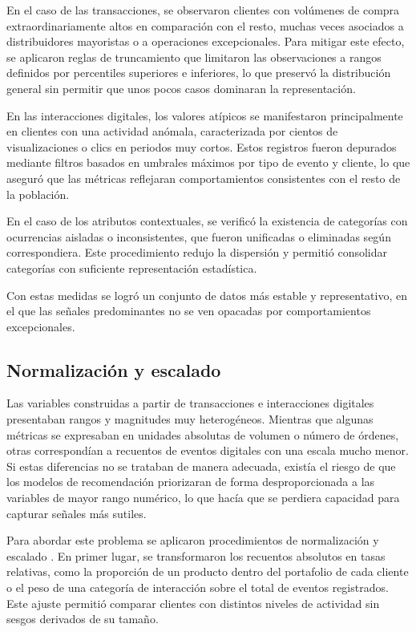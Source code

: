 En el caso de las transacciones, se observaron clientes con volúmenes de compra extraordinariamente altos en comparación con el resto, muchas veces asociados a distribuidores mayoristas o a operaciones excepcionales. Para mitigar este efecto, se aplicaron reglas de truncamiento que limitaron las observaciones a rangos definidos por percentiles superiores e inferiores, lo que preservó la distribución general sin permitir que unos pocos casos dominaran la representación.

En las interacciones digitales, los valores atípicos se manifestaron principalmente en clientes con una actividad anómala, caracterizada por cientos de visualizaciones o clics en periodos muy cortos. Estos registros fueron depurados mediante filtros basados en umbrales máximos por tipo de evento y cliente, lo que aseguró que las métricas reflejaran comportamientos consistentes con el resto de la población.

En el caso de los atributos contextuales, se verificó la existencia de categorías con ocurrencias aisladas o inconsistentes, que fueron unificadas o eliminadas según correspondiera. Este procedimiento redujo la dispersión y permitió consolidar categorías con suficiente representación estadística.

Con estas medidas se logró un conjunto de datos más estable y representativo, en el que las señales predominantes no se ven opacadas por comportamientos excepcionales.

\subsection{Normalización y escalado}

Las variables construidas a partir de transacciones e interacciones digitales presentaban rangos y magnitudes muy heterogéneos. Mientras que algunas métricas se expresaban en unidades absolutas de volumen o número de órdenes, otras correspondían a recuentos de eventos digitales con una escala mucho menor. Si estas diferencias no se trataban de manera adecuada, existía el riesgo de que los modelos de recomendación priorizaran de forma desproporcionada a las variables de mayor rango numérico, lo que hacía que se perdiera capacidad para capturar señales más sutiles.

Para abordar este problema se aplicaron procedimientos de normalización y escalado \cite{BOOK:Aggarwal2016}. En primer lugar, se transformaron los recuentos absolutos en tasas relativas, como la proporción de un producto dentro del portafolio de cada cliente o el peso de una categoría de interacción sobre el total de eventos registrados. Este ajuste permitió comparar clientes con distintos niveles de actividad sin sesgos derivados de su tamaño.

